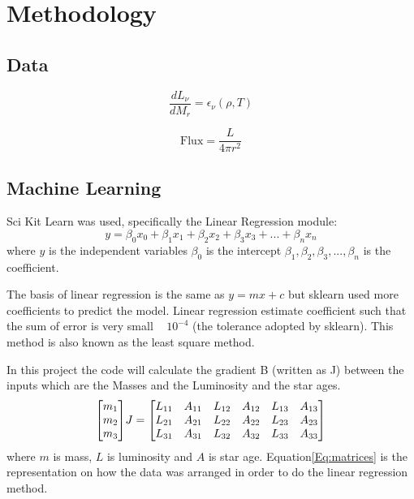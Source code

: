 \section{Methodology}

\subsection{Data}

\begin{equation}
    \frac{dL_\nu}{dM_{r}}=\epsilon_{\nu}(\rho,T)
\end{equation}

\begin{equation}
    \mathrm{Flux}=\frac{L}{4\pi r^2}
\end{equation}


\subsection{Machine Learning}
Sci Kit Learn was used, specifically the Linear Regression module:
\begin{equation}
    y=\beta_{0}x_0+\beta_{1}x_1+\beta_{2}x_2+\beta_{3}x_3+...+\beta_{n}x_n
\end{equation}
where 
$y$ is the independent variables 
$\beta_0$ is the intercept 
$\beta_{1}, \beta_{2}, \beta_{3},..., \beta_{n}$ is the coefficient. 

The basis of linear regression is the same as $y= mx+c$ but sklearn used more coefficients to predict the model. Linear regression estimate  coefficient such that the sum of error is very small ~  $10^{-4}$ (the tolerance adopted by sklearn). This method is also known as the least square method.

In this project the code will calculate the gradient B (written as J)  between the inputs which are the Masses and the Luminosity and the star ages.
\begin{equation}
    \mqty[
        m_{1}\\m_{2}\\m_{3}  
    ]
    J
    =
    \mqty[
        L_{11}&A_{11}&L_{12}&A_{12}&L_{13}&A_{13}\\
        L_{21}&A_{21}&L_{22}&A_{22}&L_{23}&A_{23}\\
        L_{31}&A_{31}&L_{32}&A_{32}&L_{33}&A_{33}
    ]
    \label{Eq:matrices}
\end{equation}
where $m$ is mass, $L$ is luminosity and $A$ is star age.
Equation\ref{Eq:matrices} is the representation on how the data was arranged in order to do the linear regression method. 

